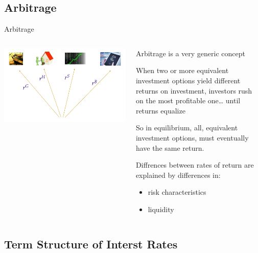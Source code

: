 \documentclass[
  ignorenonframetext,
  aspectratio=169,
]{beamer}
\providecommand{\tightlist}{%
  \setlength{\itemsep}{0pt}\setlength{\parskip}{0pt}}\usepackage{longtable,booktabs,array}
\begin{document}
\subsection{Arbitrage}\label{arbitrage}

\begin{frame}{Arbitrage}
\begin{columns}[T]
\begin{column}{0.48\textwidth}
\includegraphics{arbitrage_1.png}
\end{column}

\begin{column}{0.48\textwidth}
Arbitrage is a very generic concept

When two or more equivalent investment options yield different returns
on investment, investors rush on the most profitable one\ldots{} until
returns equalize

So in equilibrium, all, equivalent investment options, must eventually
have the same return.

Diffrences between rates of return are explained by differences in:

\begin{itemize}
\tightlist
\item
  risk characteristics
\item
  liquidity
\end{itemize}
\end{column}
\end{columns}
\end{frame}

\subsection{Term Structure of Interst
Rates}\label{term-structure-of-interst-rates}
\end{document}
